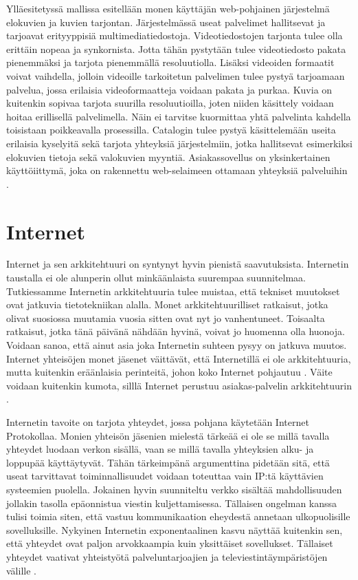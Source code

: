 \documentclass[utf8]{gradu3}
\begin{document}
Ylläesitetyssä mallissa esitellään monen käyttäjän web-pohjainen järjestelmä elokuvien ja kuvien tarjontan. Järjestelmässä useat palvelimet hallitsevat ja tarjoavat erityyppisiä multimediatiedostoja. Videotiedostojen tarjonta tulee olla erittäin nopeaa ja synkornista. Jotta tähän pystytään tulee videotiedosto pakata pienemmäksi ja tarjota pienemmällä resoluutiolla. Lisäksi videoiden formaatit voivat vaihdella, jolloin videoille tarkoitetun palvelimen tulee pystyä tarjoamaan palvelua, jossa erilaisia videoformaatteja voidaan pakata ja purkaa. Kuvia on kuitenkin sopivaa tarjota suurilla resoluutioilla, joten niiden käsittely voidaan hoitaa erillisellä palvelimella. Näin ei tarvitse kuormittaa yhtä palvelinta kahdella toisistaan poikkeavalla prosessilla. Catalogin tulee pystyä käsittelemään useita erilaisia kyselyitä sekä tarjota yhteyksiä järjestelmiin, jotka hallitsevat esimerkiksi elokuvien tietoja sekä valokuvien myyntiä. Asiakassovellus on yksinkertainen käyttöiittymä, joka on rakennettu web-selaimeen ottamaan yhteyksiä palveluihin \parencite[s. 163]{Sommerville}. 

\chapter{Internet}
Internet ja sen arkkitehtuuri on syntynyt hyvin pienistä saavutuksista. Internetin taustalla ei ole alunperin ollut minkäänlaista suurempaa suunnitelmaa. Tutkiessamme Internetin arkkitehtuuria tulee muistaa, että tekniset muutokset ovat jatkuvia tietotekniikan alalla. Monet arkkitehtuurilliset ratkaisut, jotka olivat suosiossa muutamia vuosia sitten ovat nyt jo vanhentuneet. Toisaalta ratkaisut, jotka tänä päivänä nähdään hyvinä, voivat jo huomenna olla huonoja. Voidaan sanoa, että ainut asia joka Internetin suhteen pysyy on jatkuva muutos. Internet yhteisöjen monet jäsenet väittävät, että Internetillä ei ole arkkitehtuuria, mutta kuitenkin eräänlaisia perinteitä, johon koko Internet pohjautuu \parencite{constant_change}. Väite voidaan kuitenkin kumota, silllä Internet perustuu asiakas-palvelin arkkitehtuurin \parencite[s. 162]{Sommerville}.
 
Internetin tavoite on tarjota yhteydet, jossa pohjana käytetään Internet Protokollaa. Monien yhteisön jäsenien mielestä tärkeää ei ole se millä tavalla yhteydet luodaan verkon sisällä, vaan se millä tavalla yhteyksien alku- ja loppupää käyttäytyvät. Tähän tärkeimpänä argumenttina pidetään sitä, että useat tarvittavat toiminnallisuudet voidaan toteuttaa vain IP:tä käyttävien systeemien puolella. Jokainen hyvin suunniteltu verkko sisältää mahdollisuuden jollakin tasolla epäonnistua viestin kuljettamisessa. Tällaisen ongelman kanssa tulisi toimia siten, että vastuu kommunikaation eheydestä annetaan ulkopuolisille sovelluksille.  Nykyinen Internetin exponentaalinen kasvu näyttää kuitenkin sen, että yhteydet ovat paljon arvokkaampia kuin yksittäiset sovellukset. Tällaiset yhteydet vaativat yhteistyötä palveluntarjoajien ja televiestintäympäristöjen välille \parencite{constant_change}. 
\end{document}
